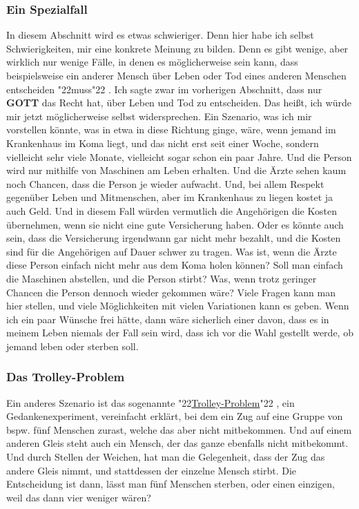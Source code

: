 \documentclass[10pt,a5paper]{article}
\newcommand{\Gott}[0]{\textbf{GOTT}}
\newcommand{\q}[1]{\char"22{#1}\char"22 }
\begin{document}
	\subsubsection{Ein Spezialfall}
		In diesem Abschnitt wird es etwas schwieriger.
		Denn hier habe ich selbst Schwierigkeiten,
		mir eine konkrete Meinung zu bilden.
		Denn es gibt wenige,
		aber wirklich nur wenige F\"alle,
		in denen es m\"oglicherweise sein kann,
		dass beispielsweise ein anderer Mensch \"uber Leben oder Tod eines anderen Menschen entscheiden \q{muss}.
		Ich sagte zwar im vorherigen Abschnitt,
		dass nur {\Gott} das Recht hat,
		\"uber Leben und Tod zu entscheiden.
		Das hei{\ss}t,
		ich w\"urde mir jetzt m\"oglicherweise selbst widersprechen.
		Ein Szenario,
		was ich mir vorstellen k\"onnte,
		was in etwa in diese Richtung ginge,
		w\"are,
		wenn jemand im Krankenhaus im Koma liegt,
		und das nicht erst seit einer Woche,
		sondern vielleicht sehr viele Monate,
		vielleicht sogar schon ein paar Jahre.
		Und die Person wird nur mithilfe von Maschinen am Leben erhalten.
		Und die \"Arzte sehen kaum noch Chancen,
		dass die Person je wieder aufwacht.
		Und,
		bei allem Respekt gegen\"uber Leben und Mitmenschen,
		aber im Krankenhaus zu liegen kostet ja auch Geld.
		Und in diesem Fall w\"urden vermutlich die Angeh\"origen die Kosten \"ubernehmen,
		wenn sie nicht eine gute Versicherung haben.
		Oder es k\"onnte auch sein,
		dass die Versicherung irgendwann gar nicht mehr bezahlt,
		und die Kosten sind f\"ur die Angeh\"origen auf Dauer schwer zu tragen.
		Was ist,
		wenn die \"Arzte diese Person einfach nicht mehr aus dem Koma holen k\"onnen?
		Soll man einfach die Maschinen abstellen,
		und die Person stirbt?
		Was,
		wenn trotz geringer Chancen die Person dennoch wieder gekommen w\"are?
		Viele Fragen kann man hier stellen,
		und viele M\"oglichkeiten mit vielen Variationen kann es geben.
		Wenn ich ein paar W\"unsche frei h\"atte,
		dann w\"are sicherlich einer davon,
		dass es in meinem Leben niemals der Fall sein wird,
		dass ich vor die Wahl gestellt werde,
		ob jemand leben oder sterben soll.
		
	\subsubsection{Das Trolley-Problem}
		Ein anderes Szenario ist das sogenannte \q{\href{https://de.wikipedia.org/wiki/Trolley-Problem}{Trolley-Problem}},
		ein Gedankenexperiment,
		vereinfacht erkl\"art,
		bei dem ein Zug auf eine Gruppe von bspw. f\"unf Menschen zurast,
		welche das aber nicht mitbekommen.
		Und auf einem anderen Gleis steht auch ein Mensch,
		der das ganze ebenfalls nicht mitbekommt.
		Und durch Stellen der Weichen,
		hat man die Gelegenheit,
		dass der Zug das andere Gleis nimmt,
		und stattdessen der einzelne Mensch stirbt.
		Die Entscheidung ist dann,
		l\"asst man f\"unf Menschen sterben,
		oder einen einzigen,
		weil das dann vier weniger w\"aren?
		
\end{document}
